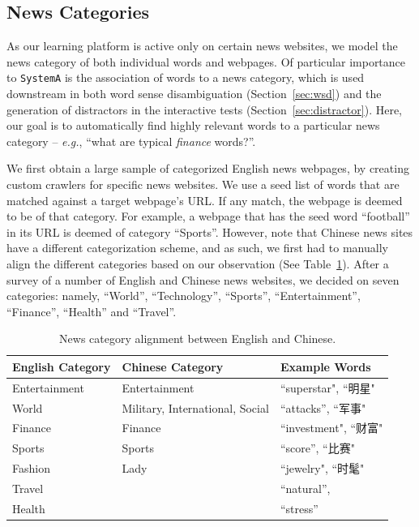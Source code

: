 \begin{CJK}{UTF8}{gbsn}
\subsection{News Categories}
\label{subsec:category}
As our learning platform is active only on certain news websites, we
model the news category of both individual words and webpages. Of
particular importance to {\tt SystemA} is the association of words to a
news category, which is used downstream in both word sense
disambiguation (Section~\ref{sec:wsd}) and the generation of
distractors in the interactive tests (Section~\ref{sec:distractor}).
Here, our goal is to automatically find highly relevant words to a
particular news category -- {\it e.g.}, ``what are typical {\it finance}
words?''.  

We first obtain a large sample of categorized English news webpages,
by creating custom crawlers for specific news websites.  We use a seed
list of words that are matched against a target webpage's URL.  If any
match, the webpage is deemed to be of that category.  For example, a
webpage that has the seed word ``football'' in its URL is deemed of
category ``Sports''.  However, note that Chinese news sites have a
different categorization scheme, and as such, we first had to manually
align the different categories based on our observation (See
Table~\ref{table:cat}).  After a survey of a number of English and
Chinese news websites, we decided on seven categories: namely,
``World'', ``Technology'', ``Sports'', ``Entertainment'', ``Finance'',
``Health'' and ``Travel''.
 

\begin{table}[ht]
\centering
  \caption{News category alignment between English and Chinese.}
  \label{table:cat}
  \begin{tabular}{| p{2.2cm} | p{2.2cm} | p{1.8cm} |}
    \hline
    {\bf English \qquad Category} & {\bf Chinese \qquad Category} & {\bf Example Words}\\
    \hline
    Entertainment & Entertainment & ``superstar", ``明星"\\
    \hline
     World &  Military, \qquad International, Social & ``attacks'', ``军事"  \\
    \hline
    Finance & Finance & ``investment", ``财富"\\
    \hline
    Sports & Sports & ``score'', ``比赛" \\
    \hline
    Fashion &  Lady & ``jewelry", ``时髦"\\
    \hline
    Travel  &  & ``natural'', \\
    \hline
   Health &  & ``stress'' \\
    \hline
  \end{tabular}
\end{table}



\end{CJK}
